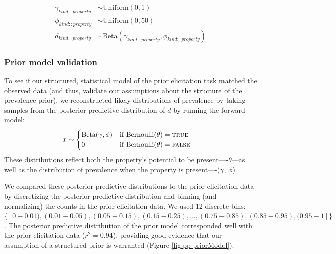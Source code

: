 \documentclass[10pt,letterpaper]{article}
\begin{document}
\begin{align*}
\gamma_{kind::property} & \sim \text{Uniform}(0, 1) \\
\phi_{kind::property} & \sim \text{Uniform}(0, 50) \\
d_{kind::property} & \sim \text{Beta}(\gamma_{kind::property}, \phi_{kind::property}) 
\end{align*}





\subsubsection{Prior model validation}

To see if our structured, statistical model of the prior elicitation task matched the observed data  (and thus, validate our assumptions about the structure of the prevalence prior), we reconstructed likely distributions of prevalence by taking samples from the posterior predictive distribution of $d$ by running the forward model: 
%
\begin{align*}
x & \sim \begin{cases} 
		\text{Beta}(\gamma, \phi) &\mbox{if } \text{Bernoulli}(\theta) = \textsc{true} \\
				0 &\mbox{if } \text{Bernoulli}(\theta) = \textsc{false}
				\end{cases} 
\end{align*}
%
These distributions reflect both the property's potential to be present----$\theta$---as well as the distribution of prevalence when the property is present----($\gamma$, $\phi$).

We compared these posterior predictive distributions to the prior elicitation data by discretizing the posterior predictive distribution and binning (and normalizing) the counts in the prior elicitation data.
We used 12 discrete bins: $\{[0-0.01), (0.01-0.05), (0.05-0.15), (0.15-0.25),  ..., (0.75-0.85), (0.85-0.95), (0.95-1]\}$.
The posterior predictive distribution of the prior model corresponded well with the prior elicitation data ($r^2=0.94$), providing good evidence that our assumption of a structured prior is warranted (Figure \ref{fig:pp-priorModel}).
\end{document}
